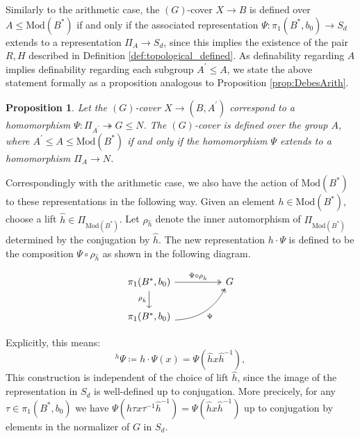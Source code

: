 \documentclass[10pt]{amsart}
\newtheorem{proposition}[theorem]{Proposition}
\theoremstyle{definition}
\begin{document}
Similarly to the arithmetic case, the $(G)$-cover $X\rightarrow B$ is defined over $A \leq \mathrm{Mod}(B^*)$ if and only if the associated representation $\Psi \colon \pi_1(B^*,b_0) \rightarrow S_d$ extends to a representation $\Pi_A \rightarrow S_d$, since this implies the existence of the pair $R,H$ described in Definition \ref{def:topological_defined}. As definability regarding $A$ implies definability regarding each subgroup $A^\prime \leq A$, we state the above statement formally as a proposition analogous to Proposition \ref{prop:DebesArith}.

\begin{proposition}
  \label{prop:DebesTop}
Let the $(G)$-cover $X \rightarrow (B,A^\prime)$ correspond to a homomorphism $\Psi: \Pi_{A^\prime}\twoheadrightarrow G \leq N$. The $(G)$-cover is defined over the group $A$, where $A^\prime \leq A \leq \mathrm{Mod}(B^*)$ if and only if the homomorphism $\Psi$ extends to a homomorphism $\Pi_{A} \rightarrow N$.
\end{proposition}



Correspondingly with the arithmetic case, we also have the action of $\mathrm{Mod}(B^*)$ to these representations in the following way. Given an element $h\in \mathrm{Mod}(B^*)$, choose a lift $\hat{h}\in \Pi_{\mathrm{Mod}(B^*)}$. Let $\rho_{\hat{h}}$ denote the inner automorphism of $\Pi_{\mathrm{Mod}(B^*)}$ determined by the conjugation by $\hat{h}$. The new representation $h\cdot \Psi$ is defined to be the composition $\Psi \circ \rho_{\hat{h}}$ as shown in the following diagram.

\[
\begin{tikzcd}
\pi_1(B^*, b_0) \arrow[d, "\rho_{\hat{h}}"'] \arrow[rr, two heads, "\Psi \circ \rho_{\hat{h}}"] & & G \\
\pi_1(B^*, b_0) \arrow[rru, two heads, bend right, "\Psi"'] & & 
\end{tikzcd}
\]


Explicitly, this means:
\begin{equation}\label{eq:top_monodromy}
^h \! \Psi \coloneqq h\cdot \Psi(x) = \Psi( \hat{h} x \hat{h}^{-1}),
\end{equation}
This construction is independent of the choice of lift $\hat{h}$, since the image of the representation in $S_d$ is well-defined up to conjugation. More precicely, for any $\tau \in \pi_1(B^*,b_0)$ we have $\Psi(\hat h \tau x \tau^{-1} \hat{h}^{-1}) = \Psi( \hat{h} x \hat{h}^{-1}) $ up to conjugation by elements in the normalizer of $G$ in $S_d$.
\end{document}
